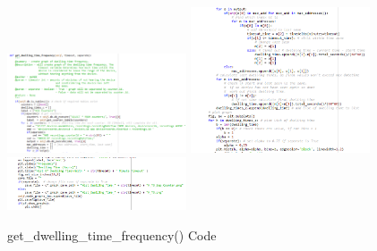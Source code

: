 \documentclass{report}
\begin{document}
\begin{figure}[h!]
    \centering
    \includegraphics[width=200]{dwellingTime1.PNG}
    \includegraphics[width=200]{dwellingTime2.PNG}
    \includegraphics[width=200]{dwellingTime3.PNG}
    \caption{get\_dwelling\_time\_frequency() Code}
    \label{fig:dwellingTime}
\end{figure} \\ 
\end{document}
